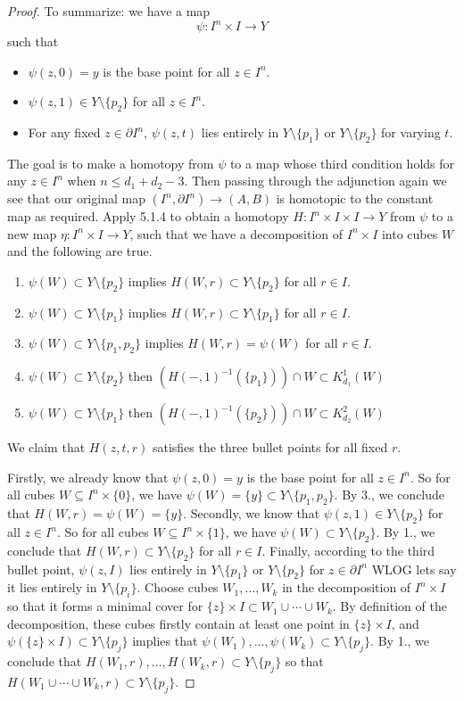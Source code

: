 \begin{lmm}{}{}
\begin{proof}
To summarize: we have a map $$\psi:I^n\times I\to Y$$ such that 
\begin{itemize}
\item $\psi(z,0)=y$ is the base point for all $z\in I^n$. 
\item $\psi(z,1)\in Y\setminus\{p_2\}$ for all $z\in I^n$. 
\item For any fixed $z\in\partial I^n$, $\psi(z,t)$ lies entirely in $Y\setminus\{p_1\}$ or $Y\setminus\{p_2\}$ for varying $t$. 
\end{itemize}
The goal is to make a homotopy from $\psi$ to a map whose third condition holds for any $z\in I^n$ when $n\leq d_1+d_2-3$. Then passing through the adjunction again we see that our original map $(I^n,\partial I^n)\to(A,B)$ is homotopic to the constant map as required. Apply 5.1.4 to obtain a homotopy $H:I^n\times I\times I\to Y$ from $\psi$ to a new map $\eta:I^n\times I\to Y$, such that we have a decomposition of $I^n\times I$ into cubes $W$ and the following are true. 
\begin{enumerate}
\item $\psi(W)\subset Y\setminus\{p_2\}$ implies $H(W,r)\subset Y\setminus\{p_2\}$ for all $r\in I$. 
\item $\psi(W)\subset Y\setminus\{p_1\}$ implies $H(W,r)\subset Y\setminus\{p_1\}$ for all $r\in I$. 
\item $\psi(W)\subset Y\setminus\{p_1,p_2\}$ implies $H(W,r)=\psi(W)$ for all $r\in I$. 
\item $\psi(W)\subset Y\setminus\{p_2\}$ then $(H(-,1)^{-1}(\{p_1\}))\cap W\subset K_{d_1}^1(W)$
\item $\psi(W)\subset Y\setminus\{p_1\}$ then $(H(-,1)^{-1}(\{p_2\}))\cap W\subset K_{d_2}^2(W)$
\end{enumerate}
We claim that $H(z,t,r)$ satisfies the three bullet points for all fixed $r$. 

Firstly, we already know that $\psi(z,0)=y$ is the base point for all $z\in I^n$. So for all cubes $W\subseteq I^n\times\{0\}$, we have $\psi(W)=\{y\}\subset Y\setminus\{p_1,p_2\}$. By 3., we conclude that $H(W,r)=\psi(W)=\{y\}$. Secondly, we know that $\psi(z,1)\in Y\setminus\{p_2\}$ for all $z\in I^n$. So for all cubes $W\subseteq I^n\times\{1\}$, we have $\psi(W)\subset Y\setminus\{p_2\}$. By 1., we conclude that $H(W,r)\subset Y\setminus\{p_2\}$ for all $r\in I$. Finally, according to the third bullet point, $\psi(z,I)$ lies entirely in $Y\setminus\{p_1\}$ or $Y\setminus\{p_2\}$ for $z\in\partial I^n$ WLOG lets say it lies entirely in $Y\setminus\{p_i\}$. Choose cubes $W_1,\dots,W_k$ in the decomposition of $I^n\times I$ so that it forms a minimal cover for $\{z\}\times I\subset W_1\cup\cdots\cup W_k$. By definition of the decomposition, these cubes firstly contain at least one point in $\{z\}\times I$, and $\psi(\{z\}\times I)\subset Y\setminus\{p_j\}$ implies that $\psi(W_1),\dots,\psi(W_k)\subset Y\setminus\{p_j\}$. By 1., we conclude that $H(W_1,r),\dots,H(W_k,r)\subset Y\setminus\{p_j\}$ so that $H(W_1\cup\cdots\cup W_k,r)\subset Y\setminus\{p_j\}$. 


\end{proof}
\end{lmm}

